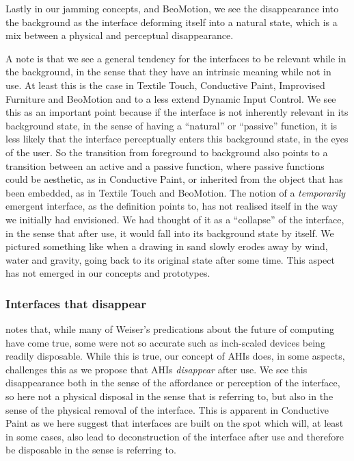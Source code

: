 Lastly in our jamming concepts, and BeoMotion, we see the disappearance into the background as the interface deforming itself into a natural state, which is a mix between a physical and perceptual disappearance.  

A note is that we see a general tendency for the interfaces to be relevant while in the background, in the sense that they have an intrinsic meaning while not in use.
At least this is the case in Textile Touch, Conductive Paint, Improvised Furniture and BeoMotion and to a less extend Dynamic Input Control.
We see this as an important point because if the interface is not inherently relevant in its background state, in the sense of having a ``natural'' or ``passive'' function, it is less likely that the interface perceptually enters this background state, in the eyes of the user.
So the transition from foreground to background also points to a transition between an active and a passive function, where passive functions could be aesthetic, as in Conductive Paint, or inherited from the object that has been embedded, as in Textile Touch and BeoMotion.
\blank
The notion of a \emph{temporarily} emergent interface, as the definition points to, has not realised itself in the way we initially had envisioned.
We had thought of it as a ``collapse'' of the interface, in the sense that after use, it would fall into its background state by itself. 
We pictured something like when a drawing in sand slowly erodes away by wind, water and gravity, going back to its original state after some time.
This aspect has not emerged in our concepts and prototypes.

\subsubsection{Interfaces that disappear}
\citet{abowd2012next} notes that, while many of Weiser's predications about the future of computing have come true, some were not so accurate such as inch-scaled devices being readily disposable.
While this is true, our concept of AHIs does, in some aspects, challenges this as we propose that AHIs \emph{disappear} after use.
We see this disappearance both in the sense of the affordance or perception of the interface, so here not a physical disposal in the sense that \citeauthor{abowd2012next} is referring to, but also in the sense of the physical removal of the interface.
This is apparent in Conductive Paint as we here suggest that interfaces are built on the spot which will, at least in some cases, also lead to deconstruction of the interface after use and therefore be disposable in the sense \citeauthor{abowd2012next} is referring to.

